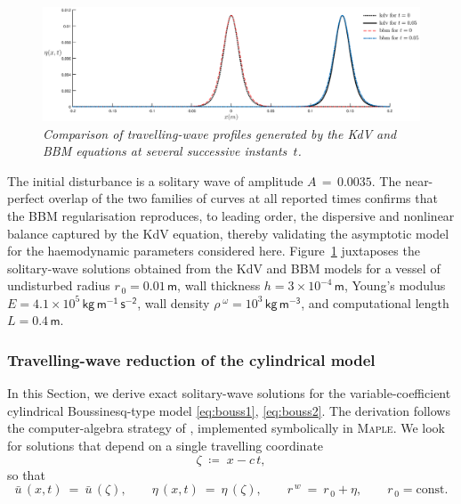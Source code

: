 \documentclass[alpha-refs, 12pt]{wiley-article}
\begin{document}
\begin{figure}
  \centering
  \includegraphics[width=\textwidth]{figs/KdVBBMSW.eps}
  \caption{\emph{Comparison of travelling-wave profiles generated by the KdV and BBM equations at several successive instants~$t$.}}
  \label{fig:2}
\end{figure}

The initial disturbance is a solitary wave of amplitude $A\,=\,0.0035$. The near-perfect overlap of the two families of curves at all reported times confirms that the BBM regularisation reproduces, to leading order, the dispersive and nonlinear balance captured by the KdV equation, thereby validating the asymptotic model for the haemodynamic parameters considered here. Figure~\ref{fig:2} juxtaposes the solitary-wave solutions obtained from the KdV and BBM models for a vessel of undisturbed radius $r_{\,0}=0.01\,\mathsf{m}$, wall thickness $h=3\times10^{-4}\,\mathsf{m}$, Young’s modulus $E=4.1\times10^{5}\,\mathsf{kg\,m^{-1}\,s^{-2}}$, wall density $\rho^{\;\omega}=10^{3}\,\mathsf{kg\,m^{-3}}$, and computational length $L=0.4\,\mathsf{m}$.

\subsubsection{Travelling-wave reduction of the cylindrical model}
\label{sec:cyl_travelling_wave}

In this Section, we derive exact solitary-wave solutions for the variable-coefficient cylindrical Boussinesq-type model \eqref{eq:bouss1}, \eqref{eq:bouss2}. The derivation follows the computer-algebra strategy of \cite{Dutykh2007}, implemented symbolically in \textsc{Maple}. We look for solutions that depend on a single travelling coordinate
\begin{equation*}
  \zeta \;\coloneqq\; x - c\,t,
\end{equation*}
so that
\begin{equation*}
  \bar{u}\,(x,t)\ =\ \bar{u}\,(\zeta), \qquad \eta\,(x,t)\ =\ \eta\,(\zeta), \qquad r^{\,w}\ =\ r_{\,0}+\eta, \qquad r_{\,0}=\text{const}.
\end{equation*}
\end{document}
